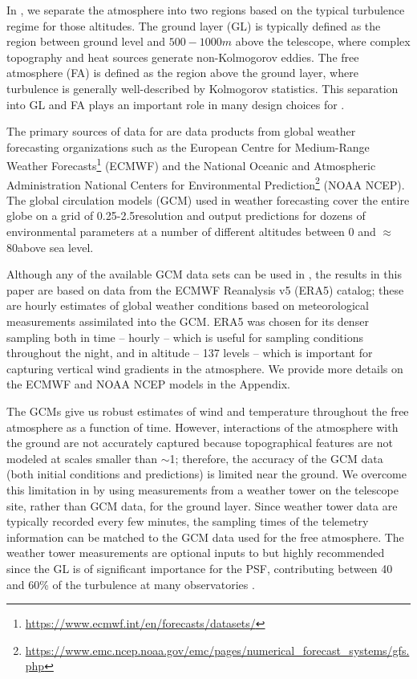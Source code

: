 \documentclass[twocolumn]{aastex631}
\begin{document}
In \psfws, we separate the atmosphere into two regions based on the typical turbulence regime for those altitudes.
The ground layer (GL) is typically defined as the region between ground level and $500-1000\unit{m}$ above the telescope, where complex topography and heat sources generate non-Kolmogorov eddies.  
The free atmosphere (FA) is defined as the region above the ground layer, where turbulence is generally well-described by Kolmogorov statistics.
This separation into GL and FA plays an important role in many design choices for \psfws.

The primary sources of data for \psfws are data products from global weather forecasting organizations such as the European Centre for Medium-Range Weather Forecasts\footnote{\url{https://www.ecmwf.int/en/forecasts/datasets/}} (ECMWF) and the National Oceanic and Atmospheric Administration National Centers for Environmental Prediction\footnote{\url{https://www.emc.ncep.noaa.gov/emc/pages/numerical_forecast_systems/gfs.php}} (NOAA NCEP).
The global circulation models (GCM) used in weather forecasting cover the entire globe on a grid of 0.25-2.5\deg resolution and output predictions for dozens of environmental parameters at a number of different altitudes between 0 and $\approx$80\km above sea level.

Although any of the available GCM data sets can be used in \psfws, the results in this paper are based on data from the ECMWF Reanalysis v5 (ERA5) catalog; these are hourly estimates of global weather conditions based on meteorological measurements assimilated into the GCM.
ERA5 was chosen for its denser sampling both in time -- hourly -- which is useful for sampling conditions throughout the night, and in altitude -- 137 levels -- which is important for capturing vertical wind gradients in the atmosphere. 
We provide more details on the ECMWF and NOAA NCEP models in the Appendix.

The GCMs give us robust estimates of wind and temperature throughout the free atmosphere as a function of time. 
However, interactions of the atmosphere with the ground are not accurately captured because topographical features are not modeled at scales smaller than $\sim$1\km; 
therefore, the accuracy of the GCM data (both initial conditions and predictions) is limited near the ground.
We overcome this limitation in \psfws by using measurements from a weather tower on the telescope site, rather than GCM data, for the ground layer.
Since weather tower data are typically recorded every few minutes, the sampling times of the telemetry information can be matched to the GCM data used for the free atmosphere.
The weather tower measurements are optional inputs to \psfws but highly recommended since the GL is of significant importance for the PSF, contributing between 40 and 60\% of the turbulence at many observatories \citep{tokovinin_statistics_2003, tokovinin_model_2005, tokovinin_optical_2005}.
\end{document}
